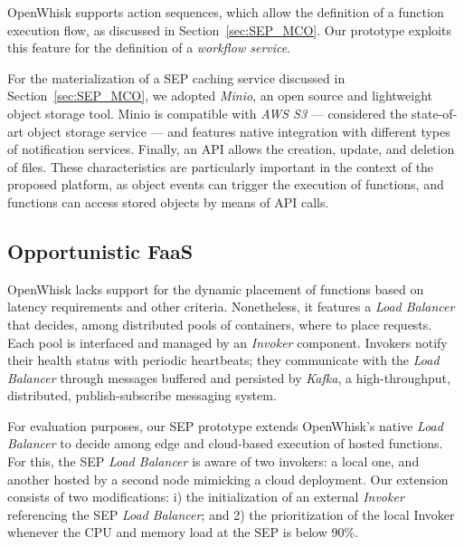 OpenWhisk supports action sequences, which allow the definition of a function execution flow, as discussed in Section~\ref{sec:SEP_MCO}. Our prototype exploits this feature for the definition of a \textit{workflow service}. 

For the materialization of a SEP caching service discussed in Section~\ref{sec:SEP_MCO}, we adopted \textit{Minio}, an open source and lightweight object storage tool. Minio is compatible with \textit{AWS S3} --- considered the state-of-art object storage service --- and features native integration with different types of notification services. Finally, an API allows the creation, update, and deletion of files. These characteristics are particularly important in the context of the proposed platform, as object events can trigger the execution of functions, and functions can access stored objects by means of API calls.




\subsection{Opportunistic FaaS}



OpenWhisk lacks support for the dynamic placement of functions based on latency requirements and other criteria. Nonetheless, it features a \textit{Load Balancer} that decides, among distributed pools of containers, where to place requests. Each pool is interfaced and managed by an \textit{Invoker} component. Invokers notify their health status with periodic heartbeats; they communicate with the \textit{Load Balancer} through messages buffered and persisted by \textit{Kafka}, a high-throughput, distributed, publish-subscribe messaging system.



For evaluation purposes, our SEP prototype extends OpenWhisk's native \textit{Load Balancer} to decide among edge and cloud-based execution of hosted functions. For this, the SEP \textit{Load Balancer} is aware of two invokers: a local one, and another hosted by a second node mimicking a cloud deployment. Our extension consists of two modifications: i) the initialization of an external \textit{Invoker} referencing the SEP \textit{Load Balancer}; and 2) the prioritization of the local Invoker whenever the CPU and memory load at the SEP is below 90\%. 

